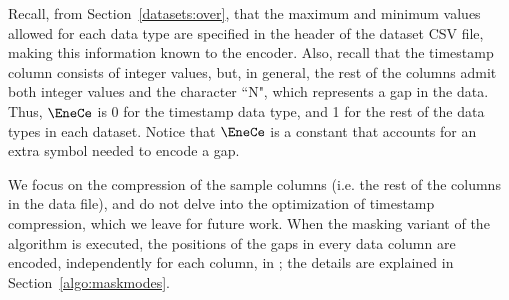Recall, from Section~\ref{datasets:over}, that the maximum and minimum values allowed for each data type are specified in the header of the dataset CSV file, making this information known to the encoder. Also, recall that the timestamp column consists of integer values, but, in general, the rest of the columns admit both integer values and the character ``N", which represents a gap in the data. Thus, $\EneCe$ is 0 for the timestamp data type, and 1 for the rest of the data types in each dataset. Notice that $\EneCe$ is a constant that accounts for an extra symbol needed to encode a gap.


\newcommand{\gapLine}{6}
We focus on the compression of the sample columns (i.e. the rest of the columns in the data file), and do not delve into the optimization of timestamp compression, which we leave for future work. When the masking variant of the algorithm is executed, the positions of the gaps in every data column are encoded, independently for each column, in \Line \gapLine; the details are explained in Section~\ref{algo:maskmodes}. 

